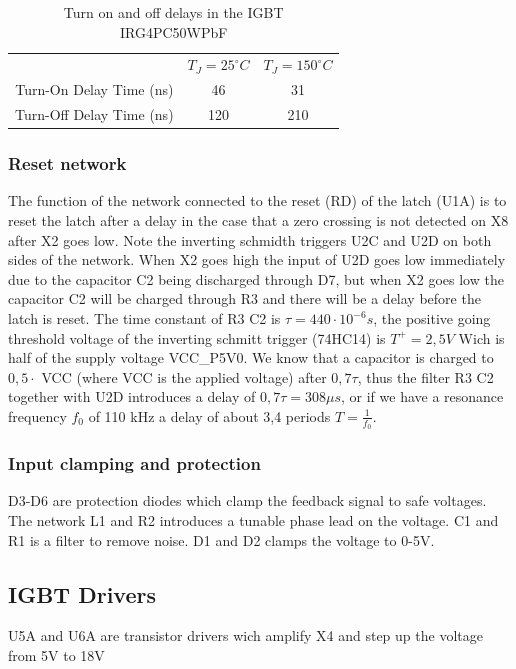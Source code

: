 \begin{table}[]
    \centering
    \begin{tabular}{c|c|c}
                            & $T_J = 25 ^{\circ}C$ & $T_J = 150 ^{\circ}C$ \\
        Turn-On Delay Time (ns)  & 46                & 31    \\
        Turn-Off Delay Time (ns) & 120               & 210
    \end{tabular}
    \caption{Turn on and off delays in the IGBT IRG4PC50WPbF}
    \label{tab:tigbt}
\end{table}

\subsubsection{Reset network}
\label{sec:reset_net}
The function of the network connected to the reset (RD) of the latch (U1A) is to reset the latch after a delay in the case that a zero crossing is not detected on X8 after X2 goes low. Note the inverting schmidth triggers U2C and U2D on both sides of the network. When X2 goes high the input of U2D goes low immediately due to the capacitor C2 being discharged through D7, but when X2 goes low the capacitor C2 will be charged through R3 and there will be a delay before the latch is reset. The time constant of R3 C2 is $\tau = 440 \cdot 10^{-6} s$, the positive going threshold voltage of the inverting schmitt trigger (74HC14) is $T^+ = 2,5V$ Wich is half of the supply voltage VCC\_P5V0. We know that a capacitor is charged to $0,5 \cdot$ VCC (where VCC is the applied voltage) after $0,7 \tau$, thus the filter R3 C2 together with U2D introduces a delay of $0,7 \tau = 308\mu s$, or if we have a resonance frequency $f_0$ of 110 kHz a delay of about 3,4 periods $T = \frac{1}{f_0}$.

\subsubsection{Input clamping and protection}
D3-D6 are protection diodes which clamp the feedback signal to safe voltages. The network L1 and R2 introduces a tunable phase lead on the voltage. C1 and R1 is a filter to remove noise. D1 and D2 clamps the voltage to 0-5V.

\subsection{IGBT Drivers}
U5A and U6A are transistor drivers wich amplify X4 and step up the voltage from 5V to 18V

